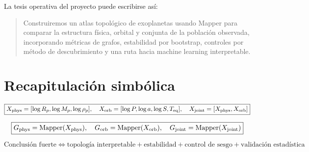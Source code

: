 \documentclass[11pt,letterpaper]{article}
\newcommand{\Rp}{R_p}
\newcommand{\Mp}{M_p}
\newcommand{\rhop}{\rho_p}
\newcommand{\Teq}{T_{\rm eq}}
\newcommand{\Mapper}{\operatorname{Mapper}}
\newcommand{\phys}{\rm phys}
\newcommand{\orb}{\rm orb}
\newcommand{\joint}{\rm joint}
\begin{document}
La tesis operativa del proyecto puede escribirse así:

\begin{quote}
Construiremos un atlas topológico de exoplanetas usando Mapper para comparar la estructura física, orbital y conjunta de la población observada, incorporando métricas de grafos, estabilidad por bootstrap, controles por método de descubrimiento y una ruta hacia machine learning interpretable.
\end{quote}

\section*{Recapitulación simbólica}

\begin{equation}
\boxed{
X_{\phys}=[\log\Rp,\log\Mp,\log\rhop],\quad
X_{\orb}=[\log P,\log a,\log S,\Teq],\quad
X_{\joint}=[X_{\phys},X_{\orb}]
}
\end{equation}

\begin{equation}
\boxed{
G_{\phys}=\Mapper(X_{\phys}),\quad
G_{\orb}=\Mapper(X_{\orb}),\quad
G_{\joint}=\Mapper(X_{\joint})
}
\end{equation}

\begin{equation}
\boxed{
\text{Conclusión fuerte}\iff
\text{topología interpretable}+
\text{estabilidad}+
\text{control de sesgo}+
\text{validación estadística}
}
\end{equation}
\end{document}
